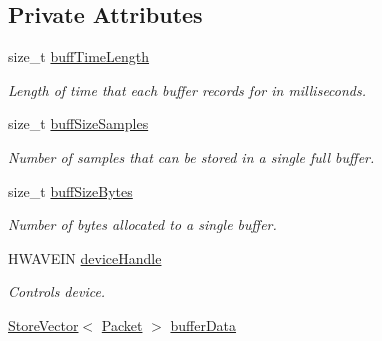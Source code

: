\subsection*{Private Attributes}
\begin{DoxyCompactItemize}
\item 
\hypertarget{class_sound_instance_input_a137354d9a5e6153530b2627dbc402268}{
size\_\-t \hyperlink{class_sound_instance_input_a137354d9a5e6153530b2627dbc402268}{buffTimeLength}}
\label{class_sound_instance_input_a137354d9a5e6153530b2627dbc402268}

\begin{DoxyCompactList}\small\item\em Length of time that each buffer records for in milliseconds. \item\end{DoxyCompactList}\item 
\hypertarget{class_sound_instance_input_a16ecc024c1ac3351bae7f960c6735517}{
size\_\-t \hyperlink{class_sound_instance_input_a16ecc024c1ac3351bae7f960c6735517}{buffSizeSamples}}
\label{class_sound_instance_input_a16ecc024c1ac3351bae7f960c6735517}

\begin{DoxyCompactList}\small\item\em Number of samples that can be stored in a single full buffer. \item\end{DoxyCompactList}\item 
\hypertarget{class_sound_instance_input_af4341c28c55c8cf07ddbfa46ee105ce2}{
size\_\-t \hyperlink{class_sound_instance_input_af4341c28c55c8cf07ddbfa46ee105ce2}{buffSizeBytes}}
\label{class_sound_instance_input_af4341c28c55c8cf07ddbfa46ee105ce2}

\begin{DoxyCompactList}\small\item\em Number of bytes allocated to a single buffer. \item\end{DoxyCompactList}\item 
\hypertarget{class_sound_instance_input_adadb8ef3b78f6d4fc12364d9995d18d7}{
HWAVEIN \hyperlink{class_sound_instance_input_adadb8ef3b78f6d4fc12364d9995d18d7}{deviceHandle}}
\label{class_sound_instance_input_adadb8ef3b78f6d4fc12364d9995d18d7}

\begin{DoxyCompactList}\small\item\em Controls device. \item\end{DoxyCompactList}\item 
\hypertarget{class_sound_instance_input_a19cd80335b30e8eb06278725d10aa316}{
\hyperlink{class_store_vector}{StoreVector}$<$ \hyperlink{class_packet}{Packet} $>$ \hyperlink{class_sound_instance_input_a19cd80335b30e8eb06278725d10aa316}{bufferData}}
\label{class_sound_instance_input_a19cd80335b30e8eb06278725d10aa316}


\end{DoxyCompactItemize}
